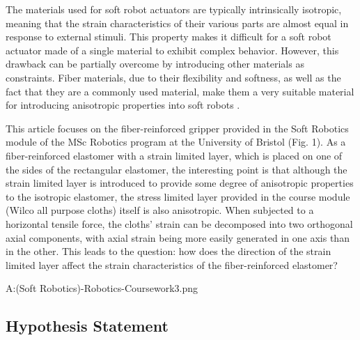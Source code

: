 \documentclass[conference]{IEEEtran}
\begin{document}
The materials used for soft robot actuators are typically intrinsically isotropic, meaning that the strain characteristics of their various parts are almost equal in response to external stimuli. This property makes it difficult for a soft robot actuator made of a single material to exhibit complex behavior. However, this drawback can be partially overcome by introducing other materials as constraints. Fiber materials, due to their flexibility and softness, as well as the fact that they are a commonly used material, make them a very suitable material for introducing anisotropic properties into soft robots \cite{overview}.



This article focuses on the fiber-reinforced gripper provided in the Soft Robotics module of the MSc Robotics program at the University of Bristol (Fig. 1). As a fiber-reinforced elastomer with a strain limited layer\cite{stress_constraint_layer}, which is placed on one of the sides of the rectangular elastomer, the interesting point is that although the strain limited layer is introduced to provide some degree of anisotropic properties to the isotropic elastomer, the stress limited layer provided in the course module  (Wilco all purpose cloths) itself is also anisotropic. When subjected to a horizontal tensile force, the cloths' strain can be decomposed into two orthogonal axial components, with axial strain being more easily generated in one axis than in the other. This leads to the question: how does the direction of the strain limited layer affect the strain characteristics of the fiber-reinforced elastomer?

A:\OneDrive\MScRobotics\SR (Soft Robotics)\Soft-Robotics-Coursework\pics{}3.png



\subsection{Hypothesis Statement}
\label{Hypothesis}
\end{document}
